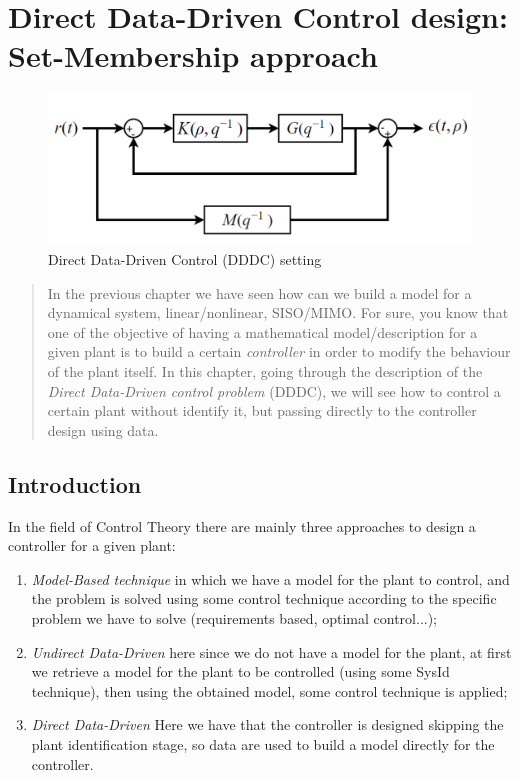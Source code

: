 \chapter[Direct Data-Driven Control (SM approach)]{Direct Data-Driven Control design: Set-Membership approach}

\vspace{-1cm}
\begin{figure}[h]
    \centering
    \includegraphics[scale=0.4]{img/DDDC_1.png}
    \caption{Direct Data-Driven Control (DDDC) setting}
    \label{fig:DDDC_setting}
\end{figure}

\begin{quotation}
    \noindent
    \textsf{In the previous chapter we have seen how can we build a model for a dynamical system, linear/nonlinear, SISO/MIMO. For sure, you know that one of the objective of having a mathematical model/description for a given plant is to build a certain \textit{controller} in order to modify the behaviour of the plant itself. In this chapter, going through the description of the \textit{Direct Data-Driven control problem} (DDDC), we will see how to control a certain plant without identify it, but passing directly to the controller design using data.
    }
\end{quotation}

\section{Introduction}
In the field of Control Theory there are mainly three approaches to design a controller for a given plant: 
\begin{enumerate}
    \itemsep-0.2em
    \item \textit{Model-Based technique} in which we have a model for the plant to control, and the problem is solved using some control technique according to the specific problem we have to solve (requirements based, optimal control...);
    \item \textit{Undirect Data-Driven} here since we do not have a model for the plant, at first we retrieve a model  for the plant to be controlled (using some SysId technique), then using the obtained model, some control technique is applied; 
    \item \textit{Direct Data-Driven} Here we have that the controller is designed skipping the plant identification stage, so data are used to build a model directly for the controller.
\end{enumerate}

